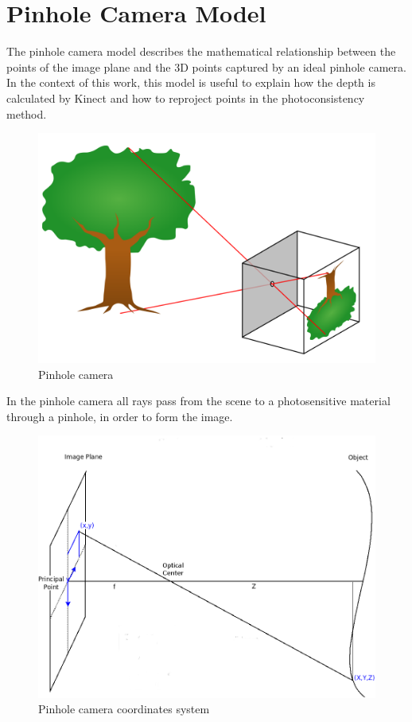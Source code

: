 
\section{Pinhole Camera Model}

The pinhole camera model describes the mathematical relationship between the points of the image plane and the 3D points captured by an 
ideal pinhole camera. In the context of this work, this model is useful to explain how the depth is calculated by Kinect and 
how to reproject points in the photoconsistency method.

\begin{figure}[H]
\begin{center}
\includegraphics[scale=0.15]{images/pinhole-camera}
\caption{Pinhole camera}
\label{fig:pinhole}
\end{center}
\end{figure}

In the pinhole camera all rays pass from the scene to a photosensitive material through a pinhole, in order to form the image.

\begin{figure}[H]
\begin{center}
\includegraphics[scale=0.25]{images/pinhole-coordinates}
\caption{Pinhole camera coordinates system}
\label{fig:pinhole}
\end{center}
\end{figure}


